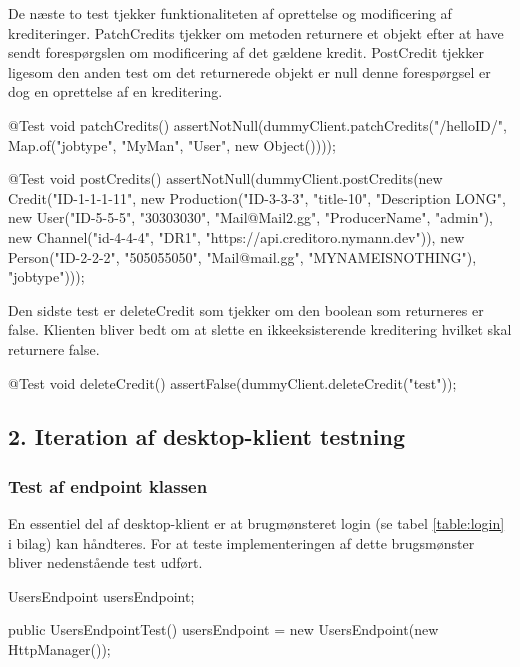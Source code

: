 De næste to test tjekker funktionaliteten af oprettelse og modificering af krediteringer. PatchCredits tjekker om metoden returnere et objekt efter at have sendt forespørgslen om modificering af det gældene kredit. PostCredit tjekker ligesom den anden test om det returnerede objekt er null denne forespørgsel er dog en oprettelse af en kreditering.

\begin{code}[caption=DummyClientTest.java, firstnumber=51]
@Test
void patchCredits() {
    assertNotNull(dummyClient.patchCredits("/helloID/", Map.of("jobtype", "MyMan", "User", new Object())));
}

@Test
void postCredits() {
    assertNotNull(dummyClient.postCredits(new Credit("ID-1-1-1-11",
            new Production("ID-3-3-3", "title-10", "Description LONG",
                    new User("ID-5-5-5", "30303030", "Mail@Mail2.gg", "ProducerName", "admin"),
                    new Channel("id-4-4-4", "DR1", "https://api.creditoro.nymann.dev")),
            new Person("ID-2-2-2", "505055050", "Mail@mail.gg", "MYNAMEISNOTHING"),
            "jobtype")));
}
\end{code}

Den sidste test er deleteCredit som tjekker om den boolean som returneres er false. Klienten bliver bedt om at slette en ikkeeksisterende kreditering hvilket skal returnere false.  

\begin{code}[caption=DummyClientTest.java, firstnumber=66]
@Test
void deleteCredit() {
    assertFalse(dummyClient.deleteCredit("test"));
}
\end{code}

\subsection{2. Iteration af desktop-klient testning}
\subsubsection{Test af endpoint klassen}
En essentiel del af desktop-klient er at brugmønsteret login (se tabel \ref{table:login} i bilag) kan håndteres. For at teste implementeringen af dette brugsmønster bliver nedenstående test udført.

\begin{code}[caption=UsersEndpointTest.java, firstnumber=8]
UsersEndpoint usersEndpoint;

public UsersEndpointTest() {
    usersEndpoint = new UsersEndpoint(new HttpManager());
}
\end{code}\\

